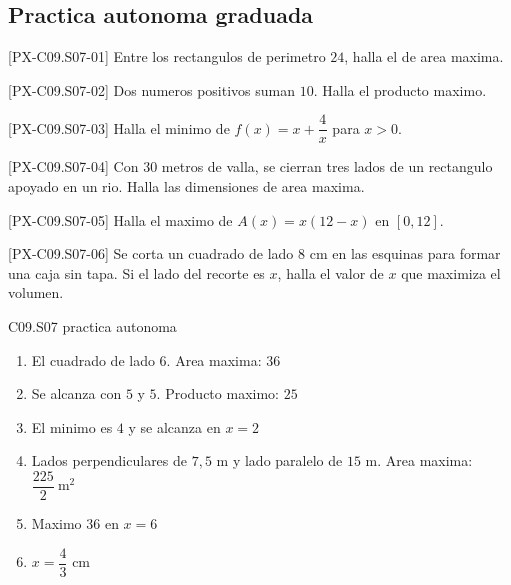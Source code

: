 \subsection*{Practica autonoma graduada}
\begin{exercise}{[PX-C09.S07-01] Entre los rectangulos de perimetro \(24\), halla el de area maxima.}
\end{exercise}
\begin{exercise}{[PX-C09.S07-02] Dos numeros positivos suman \(10\). Halla el producto maximo.}
\end{exercise}
\begin{exercise}{[PX-C09.S07-03] Halla el minimo de \(f(x)=x+\dfrac{4}{x}\) para \(x>0\).}
\end{exercise}
\begin{exercise}{[PX-C09.S07-04] Con \(30\) metros de valla, se cierran tres lados de un rectangulo apoyado en un rio. Halla las dimensiones de area maxima.}
\end{exercise}
\begin{exercise}{[PX-C09.S07-05] Halla el maximo de \(A(x)=x(12-x)\) en \([0,12]\).}
\end{exercise}
\begin{exercise}{[PX-C09.S07-06] Se corta un cuadrado de lado \(8\) cm en las esquinas para formar una caja sin tapa. Si el lado del recorte es \(x\), halla el valor de \(x\) que maximiza el volumen.}
\end{exercise}

\begin{shortanswer}{C09.S07 practica autonoma}
\begin{enumerate}[label=\textbf{PX-C09.S07-\arabic*:}, leftmargin=*]
  \item El cuadrado de lado \(6\). Area maxima: \(36\)
  \item Se alcanza con \(5\) y \(5\). Producto maximo: \(25\)
  \item El minimo es \(4\) y se alcanza en \(x=2\)
  \item Lados perpendiculares de \(7{,}5\) m y lado paralelo de \(15\) m. Area maxima:
  \(\dfrac{225}{2}\ \text{m}^2\)
  \item Maximo \(36\) en \(x=6\)
  \item \(x=\dfrac{4}{3}\) cm
\end{enumerate}
\end{shortanswer}

